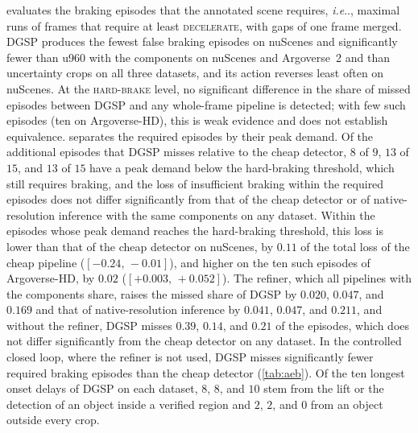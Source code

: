 \documentclass[10pt,letterpaper]{article}
\makeatletter
\DeclareRobustCommand\onedot{\futurelet\@let@token\@onedot}
\def\@onedot{\ifx\@let@token.\else.\null\fi\xspace}
\def\ie{\emph{i.e}\onedot} \def\Ie{\emph{I.e}\onedot}
\newcommand{\method}{DGSP\xspace}
\newcommand{\ci}[2]{[#1,\allowbreak\,#2]}
\theoremstyle{remark}
\theoremstyle{plain}
\theoremstyle{definition}
\makeatother
\begin{document}
 evaluates the braking episodes that the annotated scene requires, \ie, maximal runs of frames that require at least \textsc{decelerate}, with gaps of one frame merged.
\method produces the fewest false braking episodes on nuScenes and significantly fewer than u960 with the components on nuScenes and Argoverse~2 and than uncertainty crops on all three datasets, and its action reverses least often on nuScenes.
At the \textsc{hard-brake} level, no significant difference in the share of missed episodes between \method and any whole-frame pipeline is detected; with few such episodes (ten on Argoverse-HD), this is weak evidence and does not establish equivalence.
 separates the required episodes by their peak demand.
Of the additional episodes that \method misses relative to the cheap detector, $8$ of $9$, $13$ of $15$, and $13$ of $15$ have a peak demand below the hard-braking threshold, which still requires braking, and the loss of insufficient braking within the required episodes does not differ significantly from that of the cheap detector or of native-resolution inference with the same components on any dataset.
Within the episodes whose peak demand reaches the hard-braking threshold, this loss is lower than that of the cheap detector on nuScenes, by $0.11$ of the total loss of the cheap pipeline ($\ci{-0.24}{-0.01}$), and higher on the ten such episodes of Argoverse-HD, by $0.02$ ($\ci{+0.003}{+0.052}$).
The refiner, which all pipelines with the components share, raises the missed share of \method by $0.020$, $0.047$, and $0.169$ and that of native-resolution inference by $0.041$, $0.047$, and $0.211$, and without the refiner, \method misses $0.39$, $0.14$, and $0.21$ of the episodes, which does not differ significantly from the cheap detector on any dataset.
In the controlled closed loop, where the refiner is not used, \method misses significantly fewer required braking episodes than the cheap detector (\cref{tab:aeb}).
Of the ten longest onset delays of \method on each dataset, $8$, $8$, and $10$ stem from the lift or the detection of an object inside a verified region and $2$, $2$, and $0$ from an object outside every crop.
\end{document}
